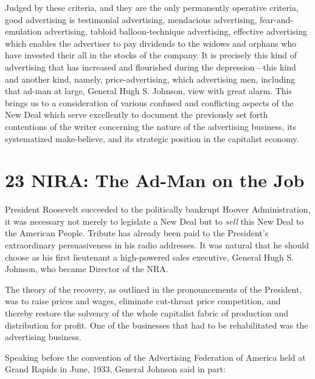 \documentclass[openany,nobib]{tufte-book}
\let\oldchapter\chapter
\def\chapter{%
  \setcounter{footnote}{0}%
  \oldchapter
}
\begin{document}
Judged by these criteria, and they are the only permanently operative
criteria, good advertising is testimonial advertising, mendacious
advertising, fear-and-emulation advertising, tabloid balloon-technique
advertising, effective advertising which enables the advertiser to pay
dividends to the widows and orphans who have invested their all in the
stocks of the company. It is precisely this kind of advertising that has
increased and flourished during the depression---this kind and another
kind, namely, price-advertising, which advertising men, including that
ad-man at large, General Hugh S. Johnson, view with great alarm. This
brings us to a consideration of various confused and conflicting aspects
of the New Deal which serve excellently to document the previously set
forth contentions of the writer concerning the nature of the advertising
business, its systematized make-believe, and its strategic position in
the capitalist economy.



\chapter[23 \hspace*{1mm} NIRA: The Ad-Man on the Job]{23 NIRA: The Ad-Man on the Job}

 President Roosevelt succeeded to the politically bankrupt Hoover
Administration, it was necessary not merely to legislate a New Deal but
to \emph{sell} this New Deal to the American People. Tribute has already
been paid to the President's extraordinary persuasiveness in his radio
addresses. It was natural that he should choose as his first lieutenant
a high-powered sales executive, General Hugh S. Johnson, who became
Director of the NRA.

The theory of the recovery, as outlined in the pronouncements of the
President, was to raise prices and wages, eliminate cut-throat price
competition, and thereby restore the solvency of the whole capitalist
fabric of production and distribution for profit. One of the businesses
that had to be rehabilitated was the advertising business.

Speaking before the convention of the Advertising Federation of America
held at Grand Rapids in June, 1933, General Johnson said in part:
\end{document}
